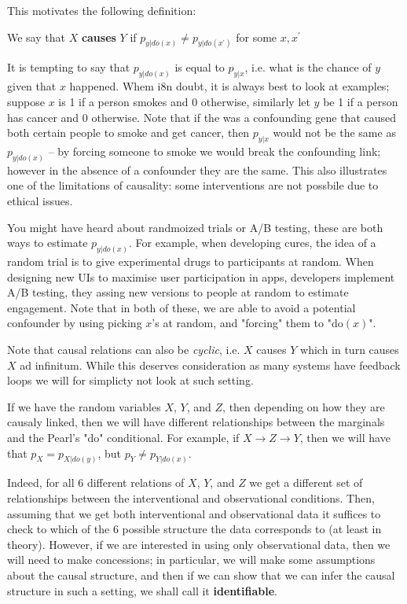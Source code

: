 This motivates the following definition:

\begin{definition}
    We say that $X$ \textbf{causes} $Y$ if $p_{y|do(x)} \neq p_{y|do(x^\prime)}$ for some
    $x, x^\prime$
\end{definition}

It is tempting to say that $p_{y|do(x)}$ is equal to $p_{y|x}$, i.e. what is the chance of $y$ given that $x$ happened.
Whem i8n doubt, it is always best to look at examples; suppose
$x$ is 1 if a person smokes and 0 otherwise, similarly let $y$ be 1 if a person 
has cancer and 0 otherwise. Note that if the was a confounding gene that caused both certain people to smoke 
and get cancer, then $p_{y|x}$ would not be the same as $p_{y|do(x)}$ -- by forcing someone to smoke we would 
break the confounding link; however in the absence of a confounder they are the same. This also illustrates 
one of the limitations of causality: some interventions are not possbile due to ethical issues.

You might have heard about randmoized trials or A/B testing, these are both ways to estimate $p_{y|do(x)}$.
For example, when developing cures, the idea of a random trial is to give experimental drugs to participants
at random. When designing new UIs to maximise user participation in apps, developers implement A/B testing, 
they assing new versions to people at random to estimate engagement. Note that in both of these, we are able 
to avoid a potential confounder by using picking $x$'s at random, and "forcing" them to "do$(x)$".

Note that causal relations can also be \textit{cyclic}, i.e. $X$ causes $Y$ which in turn causes 
$X$ ad infinitum. While this deserves consideration as many systems have feedback loops we will
for simplicty not look at such setting.

If we have the random variables $X$, $Y$, and $Z$, then depending on how they are causaly linked, then 
we will have different relationships between the marginals and the Pearl's "do" conditional. For example,
if $X \rightarrow Z \rightarrow Y$, then we will have that $p_X = p_{X|do(y)}$, but $p_Y \neq p_{Y|do(x)}$. 

Indeed, for all 6 different relations of $X$, $Y$, and $Z$ we get a different set of relationships between 
the interventional and observational conditions. Then, assuming that we get both interventional and observational data it suffices to check to which of the 6 
possible structure the data corresponds to (at least in theory). However, if we are interested in using only 
observational data, then we will need to make concessions; in particular, we will make some assumptions about 
the causal structure, and then if we can show that we can infer the causal structure in such a setting, we 
shall call it \textbf{identifiable}.

